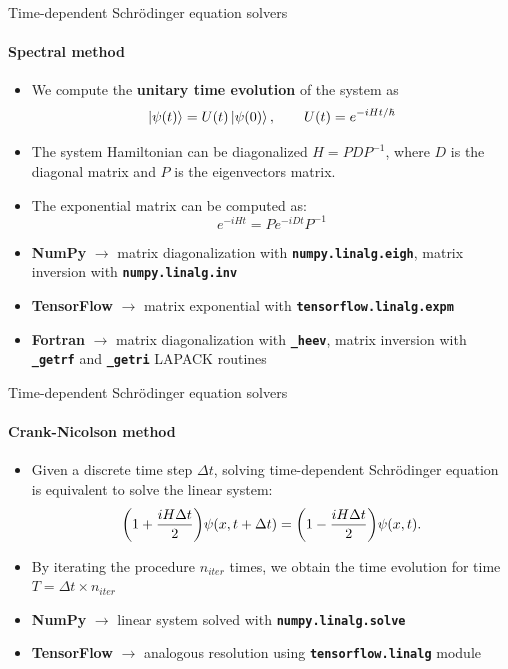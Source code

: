 \documentclass[8pt]{beamer}
\begin{document}
\begin{frame}[c]{Time-dependent Schr{\"o}dinger equation solvers
}
\framesubtitle{Spectral method}
\begin{itemize}
    \item We compute the \textbf{unitary time evolution} of the system as \begin{equation*}
    \left\vert{\psi(t)}\right\rangle = U(t) \left\vert{\psi(0)}\right\rangle, \qquad U(t)=e^{-iHt/\hbar}
    \end{equation*}
    \item The system Hamiltonian can be diagonalized $H = PDP^{-1}$, where $D$ is the diagonal matrix and $P$ is the eigenvectors matrix.
    \item The exponential matrix can be computed as: 
    \begin{equation*}
    e^{-iHt} = P e^{-iDt} P^{-1}
    \end{equation*}
    \vspace{0.5cm}
    \item \textbf{NumPy} $\rightarrow$ matrix diagonalization with {\bfseries\texttt{numpy.linalg.eigh}}, matrix inversion with {\bfseries\texttt{numpy.linalg.inv}}
    \item \textbf{TensorFlow} $\rightarrow$ matrix exponential with {\bfseries\texttt{tensorflow.linalg.expm}}
    \item \textbf{Fortran} $\rightarrow$ matrix diagonalization with {\bfseries\texttt{\_heev}}, matrix inversion with  {\bfseries\texttt{\_getrf}} and {\bfseries\texttt{\_getri}} LAPACK routines
\end{itemize}
\end{frame}

\begin{frame}[c]{Time-dependent Schr{\"o}dinger equation solvers
}
\framesubtitle{Crank-Nicolson method}
\begin{itemize}
    \item Given a discrete time step $\Delta t$, solving time-dependent Schr{\"o}dinger equation is equivalent to solve the linear system:
    \begin{equation*}
    \qty( 1 + \frac{iH\Delta t}{2} )    \psi(x,t+\Delta t) = \qty( 1 - \frac{iH\Delta t}{2} ) \psi(x,t).
    \end{equation*}
    \item By iterating the procedure $n_{iter}$ times, we obtain the time evolution for time $T = \Delta t \times n_{iter}$
    \vspace{0.5cm}
    \item \textbf{NumPy} $\rightarrow$ linear system solved with  {\bfseries\texttt{numpy.linalg.solve}}
    \item \textbf{TensorFlow} $\rightarrow$ analogous resolution using {\bfseries\texttt{tensorflow.linalg}} module
\end{itemize}

\end{frame}
\end{document}
